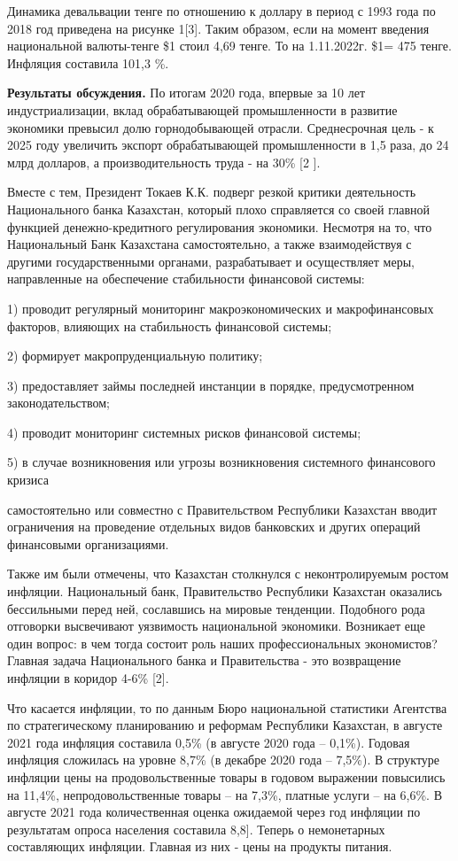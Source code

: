 \begin{multicols}{2}
Динамика девальвации тенге по отношению к доллару в период с 1993 года
по 2018 год приведена на рисунке 1{[}3{]}. Таким образом, если на момент
введения национальной валюты-тенге \$1 стоил 4,69 тенге. То на
1.11.2022г. \$1= 475 тенге. Инфляция составила 101,3 \%.

{\bfseries Результаты обсуждения.} По итогам 2020 года, впервые за 10 лет
индустриализации, вклад обрабатывающей промышленности в развитие
экономики превысил долю горнодобывающей отрасли. Среднесрочная цель - к
2025 году увеличить экспорт обрабатывающей промышленности в 1,5 раза, до
24 млрд долларов, а производительность труда - на 30\% {[}2 {]}.

Вместе с тем, Президент Токаев К.К. подверг резкой критики деятельность
Национального банка Казахстан, который плохо справляется со своей
главной функцией денежно-кредитного регулирования экономики. Несмотря на
то, что Национальный Банк Казахстана самостоятельно, а также
взаимодействуя с другими государственными органами, разрабатывает и
осуществляет меры, направленные на обеспечение стабильности финансовой
системы:

1) проводит регулярный мониторинг макроэкономических и макрофинансовых
факторов, влияющих на стабильность финансовой системы;

2) формирует макропруденциальную политику;

3) предоставляет займы последней инстанции в порядке, предусмотренном
законодательством;

4) проводит мониторинг системных рисков финансовой системы;

5) в случае возникновения или угрозы возникновения системного
финансового кризиса

самостоятельно или совместно с Правительством Республики Казахстан
вводит ограничения на проведение отдельных видов банковских и других
операций финансовыми организациями.

Также им были отмечены, что Казахстан столкнулся с неконтролируемым
ростом инфляции. Национальный банк, Правительство Республики Казахстан
оказались бессильными перед ней, сославшись на мировые тенденции.
Подобного рода отговорки высвечивают уязвимость национальной экономики.
Возникает еще один вопрос: в чем тогда состоит роль наших
профессиональных экономистов? Главная задача Национального банка и
Правительства - это возвращение инфляции в коридор 4-6\% {[}2{]}.

Что касается инфляции, то по данным Бюро национальной статистики
Агентства по стратегическому планированию и реформам Республики
Казахстан, в августе 2021 года инфляция составила 0,5\% (в августе 2020
года -- 0,1\%). Годовая инфляция сложилась на уровне 8,7\% (в декабре
2020 года -- 7,5\%). В структуре инфляции цены на продовольственные
товары в годовом выражении повысились на 11,4\%, непродовольственные
товары -- на 7,3\%, платные услуги -- на 6,6\%. В августе 2021 года
количественная оценка ожидаемой через год инфляции по результатам опроса
населения составила 8,8{]}. Теперь о немонетарных составляющих инфляции.
Главная из них - цены на продукты питания.
\end{multicols}

